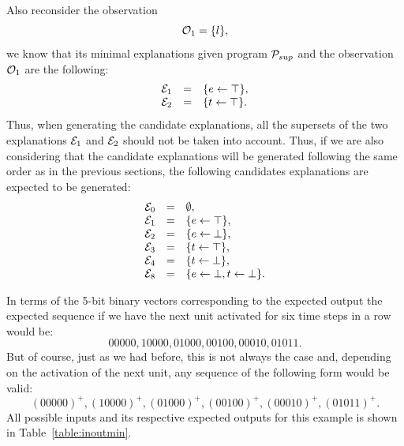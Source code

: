 Also reconsider the observation 
\[
\mathcal{O}_1 = \{l\},
\] 
we know that its minimal explanations given program $\mathcal{P}_{sup}$ and the observation $\mathcal{O}_1$ are the following:
\[
\begin{array}{lcl}
\mathcal{E}_1 &=& \{e \leftarrow \top\}, \\
\mathcal{E}_2 &=& \{t \leftarrow \top\}.
\end{array}
\]
Thus, when generating the candidate explanations, all the supersets of the two explanations $\mathcal{E}_1$ and $\mathcal{E}_2$ should not be taken into account. Thus, if we are also considering that the candidate explanations will be generated following the same order as in the previous sections, the following candidates explanations are expected to be generated: 
\[
\begin{array}{lcl}
\mathcal{E}_0 &=& \emptyset,\\
\mathcal{E}_1 &=& \{e \leftarrow \top\}, \\
\mathcal{E}_2 &=& \{e \leftarrow \bot\}, \\
\mathcal{E}_3 &=& \{t \leftarrow \top\}, \\
\mathcal{E}_4 &=& \{t \leftarrow \bot\}, \\
\mathcal{E}_8 &=& \{e \leftarrow \bot, t \leftarrow \bot\}. 
\end{array}
\]

In terms of the 5-bit binary vectors corresponding to the expected output the expected sequence if we have the next unit activated for six time steps in a row would be: 
\[
00000, 10000, 01000, 00100, 00010, 01011. 
\]
But of course, just as we had before, this is not always the case and, depending on the activation of the next unit, any sequence of the following form would be valid: 
\[
(00000)^+, (10000)^+, (01000)^+, (00100)^+, (00010)^+, (01011)^+.
\]
All possible inputs and its respective expected outputs for this example is shown in Table~\ref{table:inoutmin}. 

